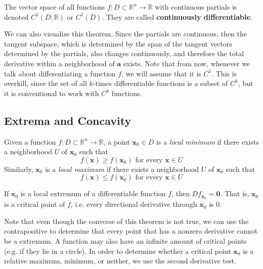   \begin{definition}[$C^1$ Space]
    The vector space of all functions $f: D \subset \mathbb{R}^n \longrightarrow \mathbb{R}$ with continuous partials is denoted $C^1 (D; \mathbb{R})$ or $C^1 (D)$. They are called \textbf{continuously differentiable}. 
  \end{definition}

  We can also visualize this theorem. Since the partials are continuous, then the tangent subspace, which is determined by the span of the tangent vectors determined by the partials, also changes continuously, and therefore the total derivative within a neighborhood of $\mathbf{a}$ exists. Note that from now, whenever we talk about differentiating a function $f$, we will assume that it is $C^1$. This is overkill, since the set of all $k$-times differentiable functions is a subset of $C^k$, but it is conventional to work with $C^k$ functions.  

\subsection{Extrema and Concavity}

  \begin{definition}
    Given a function $f: D \subset \mathbb{R}^n \longrightarrow \mathbb{R}$, a point $\mathbf{x}_0 \in D$ is a \textit{local minimum} if there exists a neighborhood $U$ of $\mathbf{x}_0$ such that 
    \[f(\mathbf{x}) \geq f(\mathbf{x}_0) \text{ for every } \mathbf{x} \in U\]
    Similarly, $\mathbf{x}_0$ is a \textit{local maximum} if there exists a neighborhood $U$ of $\mathbf{x}_0$ such that 
    \[f(\mathbf{x}) \leq f(\mathbf{x}_0) \text{ for every } \mathbf{x} \in U\]
  \end{definition}

  \begin{theorem}
    If $\mathbf{x}_0$ is a local extremum of a differentiable function $f$, then $D f_{\mathbf{x}_0} = \mathbf{0}$. That is, $\mathbf{x}_0$ is a critical point of $f$, i.e. every directional derivative through $\mathbf{x}_0$ is $0$. 
  \end{theorem}

  Note that even though the converse of this theorem is not true, we can use the contrapositive to determine that every point that has a nonzero derivative cannot be a extremum. A function may also have an infinite amount of critical points (e.g. if they lie in a circle). In order to determine whether a critical point $\mathbf{x}_0$ is a relative maximum, minimum, or neither, we use the second derivative test. 

